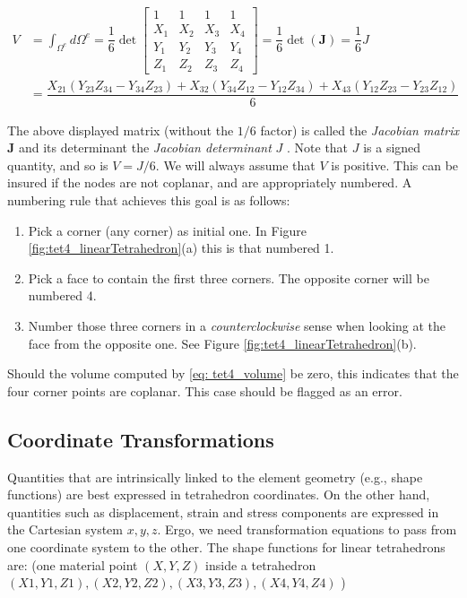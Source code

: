 \begin{equation} \label{eq: tet4_volume}
\begin{split}
V &= \int_{\Omega^e} d\Omega^e  = \dfrac{1}{6} \det \begin{bmatrix}
1 & 1 & 1 & 1\\
X_1 & X_2 & X_3 & X_4\\
Y_1 & Y_2 & Y_3 & Y_4\\
Z_1 & Z_2 & Z_3 & Z_4
\end{bmatrix} = \dfrac{1}{6} \det (\mathbf{J}) = \dfrac{1}{6} J \\
&= \dfrac{X_{21}(Y_{23}Z_{34}-Y_{34}Z_{23})+X_{32}(Y_{34}Z_{12}-Y_{12}Z_{34})+X_{43}(Y_{12}Z_{23}-Y_{23}Z_{12})}{6} 
\end{split}
\end{equation}

The above displayed matrix (without the $ 1/6 $ factor) is called the \textit{Jacobian matrix} $ \mathbf{J} $ and its determinant the \textit{Jacobian determinant} $ J $ . Note that $ J $ is a signed quantity, and so is $ V = J/6 $. We will always assume that $ V $ is positive. This can be insured if the nodes are not coplanar, and are appropriately numbered. A numbering rule that achieves this goal is as follows:

\begin{enumerate}[I]
\item Pick a corner (any corner) as initial one. In Figure \ref{fig:tet4_linearTetrahedron}(a) this is that numbered 1.
\item Pick a face to contain the first three corners. The opposite corner will be numbered 4.
\item Number those three corners in a \textit{counterclockwise} sense when looking at the face from the opposite one. See Figure \ref{fig:tet4_linearTetrahedron}(b).
\end{enumerate}

Should the volume computed by \ref{eq: tet4_volume} be zero, this indicates that the four corner points are coplanar. This case should be flagged as an error.

\subsection{Coordinate Transformations}
Quantities that are intrinsically linked to the element geometry (e.g., shape functions) are best expressed in tetrahedron coordinates. On the other hand, quantities such as displacement, strain and stress components are expressed in the Cartesian system $ {x,y,z} $. Ergo, we need transformation equations to pass from one coordinate system to the other. The shape functions for linear tetrahedrons are: (one material point $ (X,Y,Z) $ inside a tetrahedron $ (X1,Y1,Z1),(X2,Y2,Z2),(X3,Y3,Z3),(X4,Y4,Z4) $ )

